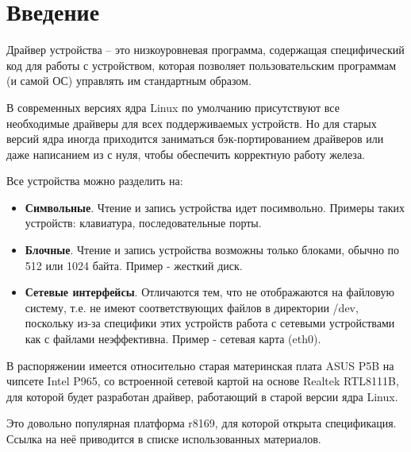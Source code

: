 \newpage
\section*{Введение}

Драйвер устройства -- это низкоуровневая программа, содержащая специфический код для работы с устройством, которая позволяет пользовательским программам (и самой ОС) управлять им стандартным образом.

В современных версиях ядра Linux по умолчанию присутствуют все необходимые драйверы для всех поддерживаемых устройств\cite{Love}. Но для старых версий ядра иногда приходится заниматься бэк-портированием драйверов или даже написанием из с нуля, чтобы обеспечить корректную работу железа.

Все устройства можно разделить на:
\begin{itemize}
\item \textbf{Символьные}. Чтение и запись устройства идет посимвольно. Примеры таких устройств: клавиатура, последовательные порты.
\item \textbf{Блочные}. Чтение и запись устройства возможны только блоками, обычно по 512 или 1024 байта. Пример - жесткий диск.
\item \textbf{Сетевые интерфейсы}. Отличаются тем, что не отображаются на файловую систему, т.е. не имеют соответствующих файлов в директории /dev, поскольку из-за специфики этих устройств работа с сетевыми устройствами как с файлами неэффективна. Пример - сетевая карта (eth0).
\end{itemize}

В распоряжении имеется относительно старая материнская плата ASUS P5B на чипсете Intel P965, со встроенной сетевой картой на основе Realtek RTL8111B, для которой будет разработан драйвер, работающий в старой версии ядра Linux.

Это довольно популярная платформа r8169, для которой открыта спецификация. Ссылка на неё приводится в списке использованных материалов.